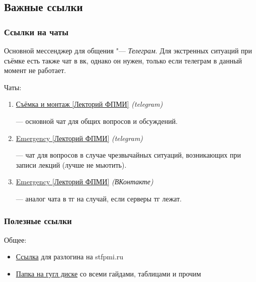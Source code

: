 \subsection{Важные ссылки}\label{ssec:important-links}

\subsubsection{Ссылки на чаты}\label{subsec:chat-references}
Основной мессенджер для общения "--- \textit{Телеграм}. Для экстренных ситуаций при съёмке есть также чат в вк, однако он нужен, только если телеграм в данный момент не работает.

Чаты:
\begin{enumerate}
  \item \hypertarget{main-chat-vk}{\href{https://t.me/+sZ_hqEHTYIg1NjYy}{Съёмка и монтаж [Лекторий ФПМИ]} \textit{(telegram)}} --- основной чат для общих вопросов и обсуждений.

  \item \hypertarget{emergency-chat-tg}{\href{https://t.me/+WyQqZQYl2w8wYjAy}{Emergency [Лекторий ФПМИ]} \textit{(telegram)}} --- чат для вопросов в случае чрезвычайных ситуаций, возникающих при записи лекций (лучше не мьютить).

  \item \hypertarget{emergency-chat-vk}{\href{https://vk.me/join/AJQ1d0vm9RxLwVfF_3bKMprQ}{Emergency [Лекторий ФПМИ]} \textit{(ВКонтакте)}} --- аналог чата в тг на случай, если серверы тг лежат.

\end{enumerate}

\subsubsection{Полезные ссылки}

Общее:
\begin{itemize}[topsep=1.5\parskip, itemsep=0.5\parskip]
  \item \href{https://infra.stfpmi.ru/auth/realms/stfpmi/account/#/}{Ссылка} для разлогина на stfpmi.ru
  \item \href{https://drive.google.com/drive/folders/1OkJQEHMSALAlE_e2tF5Y0Ol1dYFrt_BD}{Папка на гугл диске} со всеми гайдами, таблицами и прочим
\end{itemize}

